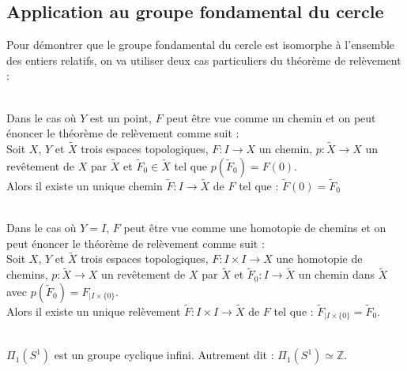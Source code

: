 	\subsection{Application au groupe fondamental du cercle}
		Pour démontrer que le groupe fondamental du cercle est isomorphe à l'ensemble des entiers relatifs, 
		on va utiliser deux cas particuliers du théorème de relèvement :
		\begin{coro}~\\
			Dans le cas où $Y$ est un point, $F$ peut être vue comme un chemin et on peut énoncer le théorème de relèvement 
			comme suit :\\
			Soit $X$, $Y$ et $\tilde{X}$ trois espaces topologiques, $F : I \longrightarrow X$ un chemin, 
			$p:\tilde{X}\longrightarrow X$ un revêtement de $X$ par $\tilde{X}$ et $\tilde{F}_{0}\in \tilde{X}$ tel que 
			$p(\tilde{F}_{0})=F(0)$.\\
			Alors il existe un unique chemin $\tilde{F} : I \longrightarrow \tilde{X}$ de $F$ tel que : 
			$\tilde{F}(0) = \tilde{F}_{0}$
		\end{coro}
		\begin{coro}~\\
			Dans le cas où $Y=I$, $F$ peut être vue comme une homotopie de chemins et on peut énoncer le théorème de relèvement 
			comme suit :\\
			Soit $X$, $Y$ et $\tilde{X}$ trois espaces topologiques, $F : I\times I \longrightarrow X$ une homotopie de chemins, 
			$p:\tilde{X}\longrightarrow X$ un revêtement de $X$ par $\tilde{X}$ et $\tilde{F}_{0} : I \longrightarrow \tilde{X}$ 
			un chemin dans $\tilde{X}$ avec $p(\tilde{F}_{0}) = F_{|I\times\{0\}}$.\\
			Alors il existe un unique relèvement $\tilde{F} : I\times I \longrightarrow \tilde{X}$ de $F$ tel que : 
			$\tilde{F}_{|I\times \{0\}} = \tilde{F}_{0}$.
		\end{coro}
\pagebreak
		\begin{theo}~\\
			$\Pi_{1}(S^{1})$ est un groupe cyclique infini. Autrement dit : $\Pi_{1}(S^{1})\simeq \mathbb{Z}$.
		\end{theo}
